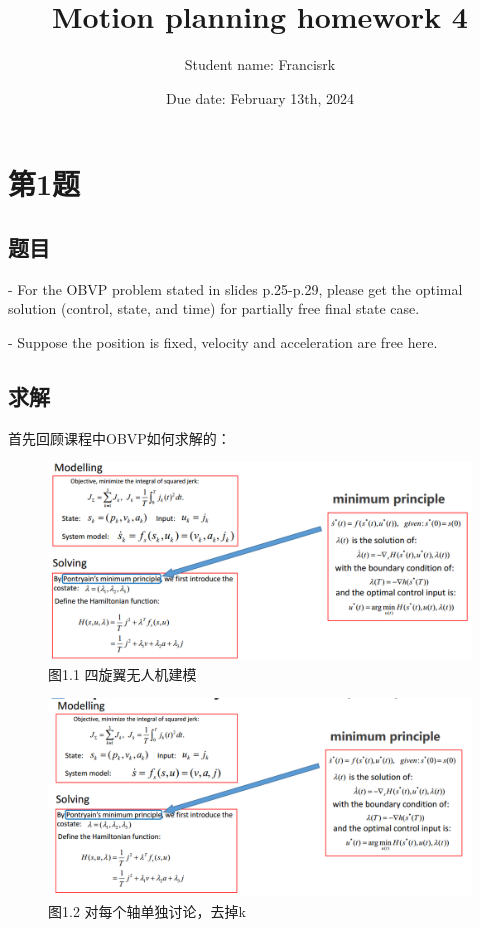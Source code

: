 \documentclass[40pt,a4paper,UTF8]{ctexart}
\title{Motion planning homework 4}
\author{Student name: Francisrk}
\date{Due date: February 13th, 2024}
\numberwithin{equation}{section}
\begin{document}
\maketitle   %


\section{第1题}
\subsection{题目}

- For the OBVP problem stated in slides p.25-p.29, please
get the optimal solution (control, state, and time) for
partially free final state case.

- Suppose the position is fixed, velocity and acceleration
are free here.

\subsection{求解}
首先回顾课程中OBVP如何求解的：
\begin{figure}[H]
\centering
\includegraphics[width=4.8in]{ch4_1.png} {图1.1 四旋翼无人机建模}
\end{figure}

\begin{figure}[H]
\centering
\includegraphics[width=4.8in]{ch4_2.png} {图1.2 对每个轴单独讨论，去掉k}
\end{figure}
\end{document}
